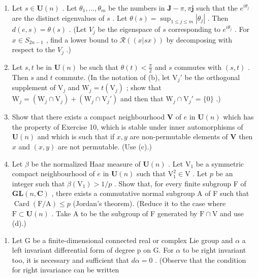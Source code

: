 \begin{enumerate}
\def\labelenumi{(\alph{enumi})}
\setcounter{enumi}{1}
\item
  Let \(s \in \mathbf{U}(n)\) . Let \(\theta_1, \ldots, \theta_m\) be the numbers in \(\mathbf{J} - \pi, \pi \mathbf{j}\) such that the \(e^{i\theta_j}\) are the distinct eigenvalues of \(s\) . Let \(\theta(s) = \sup_{1 \leqslant j \leqslant m} |\theta_j|\) . Then \(d(e, s) = \theta(s)\) . (Let \(V_j\) be the eigenspace of \(s\) corresponding to \(e^{i\theta_j}\) . For \(x \in S_{2n-1}\) , find a lower bound to \(\mathcal{R}((x|sx))\) by decomposing with respect to the \(V_j\) .)
\item
  Let \(s, t\) be in \(\mathbf{U}(n)\) be such that \(\theta(t) < \frac{\pi}{2}\) and \(s\) commutes with \((s, t)\) . Then \(s\) and \(t\) commute. (In the notation of (b), let \(\mathrm{V}_j'\) be the orthogonal supplement of \(\mathrm{V}_j\) and \(\mathrm{W}_j = t(\mathrm{V}_j)\) ; show that \(\mathrm{W}_j = (\mathrm{W}_j \cap \mathrm{V}_j) + (\mathrm{W}_j \cap \mathrm{V}_j')\) and then that \(\mathrm{W}_j \cap \mathrm{V}_j' = \{0\}\) .)
\item
  Show that there exists a compact neighbourhood \(\mathbf{V}\) of \(e\) in \(\mathbf{U}(n)\) which has the property of Exercise 10, which is stable under inner automorphisms of \(\mathbf{U}(n)\) and which is such that if \(x, y\) are non-permutable elements of \(\mathbf{V}\) then \(x\) and \((x, y)\) are not permutable. (Use (c).)
\item
  Let \(\beta\) be the normalized Haar measure of \(\mathbf{U}(n)\) . Let \(\mathrm{V}_1\) be a symmetric compact neighbourhood of \(e\) in \(\mathbf{U}(n)\) such that \(\mathrm{V}_1^2 \in \mathrm{V}\) . Let \(p\) be an integer such that \(\beta (\mathrm{V}_1) > 1 / p\) . Show that, for every finite subgroup F of \(\mathbf{GL}(n,\mathbf{C})\) , there exists a commutative normal subgroup A of F such that \(\operatorname{Card}(\mathrm{F} / \mathrm{A}) \leqslant p\) (Jordan's theorem). (Reduce it to the case where \(\mathrm{F} \subset \mathbf{U}(n)\) . Take A to be the subgroup of F generated by \(\mathrm{F} \cap \mathrm{V}\) and use (d).)
\end{enumerate}

\begin{enumerate}
\def\labelenumi{\arabic{enumi}.}
\setcounter{enumi}{11}
\tightlist
\item
  Let G be a finite-dimensional connected real or complex Lie group and \(\alpha\) a left invariant differential form of degree p on G. For \(\alpha\) to be right invariant too, it is necessary and sufficient that \(d\alpha = 0\) . (Observe that the condition for right invariance can be written
\end{enumerate}

